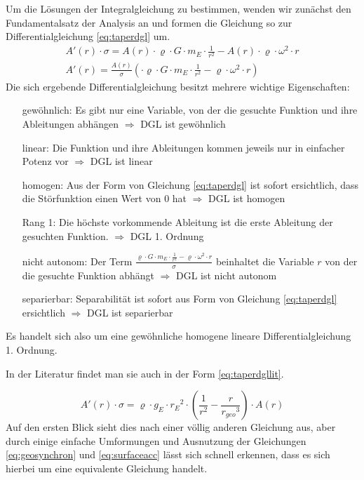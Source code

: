 \documentclass[a4paper, 10pt]{report}
\begin{document}
Um die Lösungen der Integralgleichung zu bestimmen, wenden wir zunächst den Fundamentalsatz der Analysis an und formen die Gleichung so zur Differentialgleichung \ref{eq:taperdgl} um.
\begin{align}
A'(r) \cdot \sigma = A(r) \cdot \varrho \cdot G \cdot m_E \cdot \frac{1}{r^2} - A(r) \cdot \varrho \cdot \omega^2 \cdot r \nonumber\\
A'(r) = \frac{A(r)}{\sigma} (\cdot \varrho \cdot G \cdot m_E \cdot \frac{1}{r^2} - \varrho \cdot \omega^2 \cdot r)
\label{eq:taperdgl}
\end{align}
Die sich ergebende Differentialgleichung besitzt mehrere wichtige Eigenschaften:
\begin{itemize}
\item[gewöhnlich:] Es gibt nur eine Variable, von der die gesuchte Funktion und ihre Ableitungen abhängen $\Rightarrow$ DGL ist gewöhnlich
\item[linear:] Die Funktion und ihre Ableitungen kommen jeweils nur in einfacher Potenz vor $\Rightarrow$ DGL ist linear
\item[homogen:] Aus der Form von Gleichung \ref{eq:taperdgl} ist sofort ersichtlich, dass die Störfunktion einen Wert von 0 hat $\Rightarrow$ DGL ist homogen
\item[Rang 1:] Die höchste vorkommende Ableitung ist die erste Ableitung der gesuchten Funktion. $\Rightarrow$ DGL 1. Ordnung
\item[nicht autonom:] Der Term $\frac{\varrho \cdot G \cdot m_E \cdot \frac{1}{r^2} - \varrho \cdot \omega^2 \cdot r}{\sigma}$ beinhaltet die Variable $r$ von der die gesuchte Funktion abhängt $\Rightarrow$ DGL ist nicht autonom
\item[separierbar:] Separabilität ist sofort aus Form von Gleichung \ref{eq:taperdgl} ersichtlich $\Rightarrow$ DGL ist separierbar
\end{itemize}
Es handelt sich also um eine gewöhnliche homogene lineare Differentialgleichung 1. Ordnung.

In der Literatur\cite{PE75} findet man sie auch in der Form \ref{eq:taperdgllit}.

\begin{equation}
A'(r) \cdot \sigma = \varrho \cdot g_E \cdot {r_E}^2 \cdot (\frac{1}{r^2} - \frac{r}{{r_{geo}}^3}) \cdot A(r)
\label{eq:taperdgllit}
\end{equation}
Auf den ersten Blick sieht dies nach einer völlig anderen Gleichung aus, aber durch einige einfache Umformungen und Ausnutzung der Gleichungen \ref{eq:geosynchron} und \ref{eq:surfaceacc} lässt sich schnell erkennen, dass es sich hierbei um eine equivalente Gleichung handelt.
\end{document}

